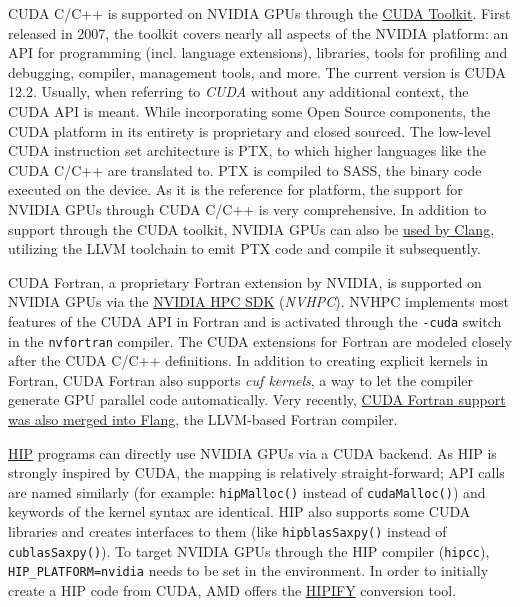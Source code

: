  CUDA C/C++ is supported on NVIDIA GPUs through the \href{https://developer.nvidia.com/cuda-toolkit}{CUDA Toolkit}. First released in 2007, the toolkit covers nearly all aspects of the NVIDIA platform: an API for programming (incl. language extensions), libraries, tools for profiling and debugging, compiler, management tools, and more. The current version is CUDA 12.2. Usually, when referring to \emph{CUDA} without any additional context, the CUDA API is meant. While incorporating some Open Source components, the CUDA platform in its entirety is proprietary and closed sourced. The low-level CUDA instruction set architecture is PTX, to which higher languages like the CUDA C/C++ are translated to. PTX is compiled to SASS, the binary code executed on the device. As it is the reference for platform, the support for NVIDIA GPUs through CUDA C/C++ is very comprehensive. In addition to support through the CUDA toolkit, NVIDIA GPUs can also be \href{https://llvm.org/docs/CompileCudaWithLLVM.html}{used by Clang}, utilizing the LLVM toolchain to emit PTX code and compile it subsequently.   

 CUDA Fortran, a proprietary Fortran extension by NVIDIA, is supported on NVIDIA GPUs via the \href{https://developer.nvidia.com/hpc-sdk}{NVIDIA HPC SDK} (\emph{NVHPC}). NVHPC implements most features of the CUDA API in Fortran and is activated through the \texttt{-cuda} switch in the \texttt{nvfortran} compiler. The CUDA extensions for Fortran are modeled closely after the CUDA C/C++ definitions. In addition to creating explicit kernels in Fortran, CUDA Fortran also supports \emph{cuf kernels}, a way to let the compiler generate GPU parallel code automatically. Very recently, \href{https://reviews.llvm.org/D150159}{CUDA Fortran support was also merged into Flang}, the LLVM-based Fortran compiler.   

 \href{https://github.com/ROCm-Developer-Tools/HIP}{HIP} programs can directly use NVIDIA GPUs via a CUDA backend. As HIP is strongly inspired by CUDA, the mapping is relatively straight-forward; API calls are named similarly (for example: \texttt{hipMalloc()} instead of \texttt{cudaMalloc()}) and keywords of the kernel syntax are identical. HIP also supports some CUDA libraries and creates interfaces to them (like \texttt{hipblasSaxpy()} instead of \texttt{cublasSaxpy()}). To target NVIDIA GPUs through the HIP compiler (\texttt{hipcc}), \texttt{HIP\_PLATFORM=nvidia} needs to be set in the environment. In order to initially create a HIP code from CUDA, AMD offers the \href{https://github.com/ROCm-Developer-Tools/HIPIFY}{HIPIFY} conversion tool.   

